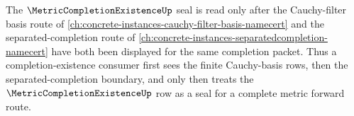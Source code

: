 The $\MetricCompletionExistenceUp$ seal is read only after the Cauchy-filter basis route of \autoref{ch:concrete-instances-cauchy-filter-basis-namecert} and the separated-completion route of \autoref{ch:concrete-instances-separatedcompletion-namecert} have both been displayed for the same completion packet. Thus a completion-existence consumer first sees the finite Cauchy-basis rows, then the separated-completion boundary, and only then treats the $\MetricCompletionExistenceUp$ row as a seal for a complete metric forward route.
